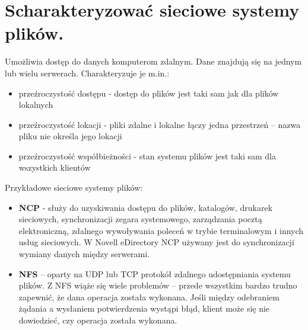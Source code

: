 \documentclass[12pt,a4paper]{article}
\begin{document}
	\section{Scharakteryzować sieciowe systemy plików.}
	\label{sec:siecsysplik}
	Umożliwia dostęp do danych komputerom zdalnym. Dane znajdują się na jednym lub wielu serwerach. Charakteryzuje je m.in.:
	\begin{itemize}
		\item przeźroczystość dostępu - dostęp do plików jest taki sam jak dla plików lokalnych
		\item przeźroczystość lokacji - pliki zdalne i lokalne łączy jedna przestrzeń -- nazwa pliku nie określa jego lokacji
		\item przeźroczystość współbieżności - stan systemu plików jest taki sam dla wszystkich klientów
	\end{itemize}

	Przykładowe sieciowe systemy plików:
	\begin{itemize}
		\item \textbf{NCP} - służy do uzyskiwania dostępu do plików, katalogów, drukarek sieciowych, synchronizacji zegara systemowego, zarządzania pocztą elektroniczną, zdalnego wywoływania poleceń w trybie terminalowym i innych usług sieciowych. W Novell eDirectory NCP używany jest do synchronizacji wymiany danych między serwerami.
		\item \textbf{NFS} – oparty na UDP lub TCP protokół zdalnego udostępniania systemu plików. Z NFS wiąże się wiele problemów – przede wszystkim bardzo trudno zapewnić, że dana operacja została wykonana. Jeśli między odebraniem żądania a wysłaniem potwierdzenia wystąpi błąd, klient może się nie dowiedzieć, czy operacja została wykonana.
	\end{itemize}
\end{document}
